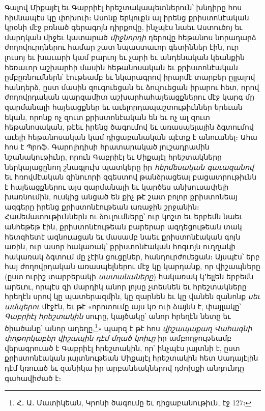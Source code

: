 \documentclass{article}
\begin{document}
{Գալով Միքայէլ եւ Գաբրիէլ հրեշտակապետներուն՝ խնդիրը հոս հիմնապէս կը փոխուի։ Ասոնք երկուքն ալ իրենց քրիստոնէական կրօնի մէջ բռնած գերագոյն դիրքովը, ինչպէս նաեւ Աստուծոյ եւ մարդկան միջեւ կատարած \emph{միջնորդի} դերովը հեթանոս նորադարձ ժողովուրդներու համար շատ նպաստաւոր գետիններ էին, ուր լուսոյ եւ խաւարի կամ բարւոյ եւ չարի եւ անդենական կեանքին հեռաւոր աշխարհի մասին հեթանոսական եւ քրիստոնէական ըմբըռնումներն՝ էութեամբ եւ նկարագրով իրարմէ տարբեր ըլլալով հանդերձ, ըստ մասին զուգուեցան եւ ձուլուեցան իրարու հետ, որով ժողովրդական պարզամիտ աշխարհահայեացքներու մէջ կարգ մը զարմանալի հայեացքներ եւ աւելորդապաշտութիւններ երեւան եկան, որոնք ոչ զուտ քրիստոնէական են եւ ոչ ալ զուտ հեթանոսական, թէեւ իրենց ծագումով եւ առասպելային ձգտումով աւելի հեթանոսական կամ դիցաբանական պէտք է անուանել։ Ահա հոս է Պրոֆ․ Գարոլիդիսի հրատարակած յուշադրամին նշանակութիւնը, որուն Գաբրիէլ եւ Միքայէլ հրեշտակները ներկայացընող շնագլուխ պատկերը իր \emph{հերմեսական գաւազանով} եւ հռովմէական զինուորի զգեստով թանձրացեալ բացատրութիւնն է հայեացքներու այս զարմանալի եւ կարծես անխուսափելի խառնումին, ուսկից անցած են քիչ թէ շատ բոլոր քրիստոնեայ ազգերը իրենց քրիստոնէութեան առաջին շրջանին։ Համեմատութիւններն ու ձուլումները՝ ուր կոշտ եւ երբեմն նաեւ անհեթեթ էին, քրիստոնէութեան բարերար ազդեցութեան տակ հետզհետէ ազնուացան եւ մասամբ նաեւ քրիստոնէական գոյն առին, ուր ասոր հակառակ՝ քրիստոնէական հոգւոյն ուղղակի հակառակ ձգտում մը չէին ցուցըներ, հանդուրժուեցան։ Այսպէս՝ երբ հայ ժողովրդական առասպելներու մէջ կը կարդանք, որ վիշապները (ըստ ուրիշ տարբերակի \emph{սատանաները}) հակառակ կ՚ելլեն երբեմն արեւու, որպէս զի մարդիկ անոր լոյսը չտեսնեն եւ հրեշտակները հրեղէն սրով կը պատերազմին, կը զարնեն եւ կը վանեն զանոնք \emph{սեւ ամպերու} մէջէն, եւ թէ «որոտումը այս կռ ուի ձայնն է, փայլակը՝ \emph{Գաբրիէլ հրեշտակին} սուրը, կայծակը՝ անոր հրեղէն նետը եւ ծիածանը՝ անոր աղեղը,\footnote{Հ․ Ա․ Մատիկեան, Կրոնի ծագումը եւ դիցաբանութիւն, էջ 127։}» պարզ է թէ հոս \emph{վիշապաքաղ Վահագնի փոթորկաբեր վիշապին դէմ մղած կոիւը} իր ամբողջութեամբ վերագրուած է Գաբրիէլ հրեշտակին, որ՝ ինչպէս յայտնի է, ըստ քրիստոնէական յայտնութեան Միքայէլ հրեշտակին հետ Սադայէլին դէմ կռուած եւ զանիկա իր արբանեակներով դժոխքի անդունդը գահավիժած է։

}
\end{document}
